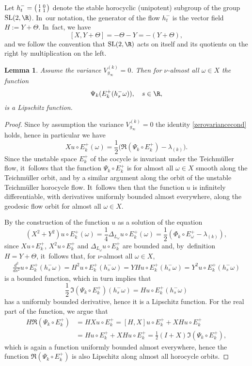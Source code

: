 \documentclass[JEP,XML,SOM,Unicode,published]{cedram}
\newenvironment{smallpmatrix}{\big(\begin{smallmatrix}}{\end{smallmatrix}\big)}
\theoremstyle{plain}
\newtheorem{lemma}[thm]{Lemma}
\theoremstyle{definition}
\numberwithin{equation}{subsection}
\newcommand{\SL}{\mathrm{SL}}
\let\laplacian\Delta
\begin{document}
Let $h^-_t =
\begin{smallpmatrix} 1 & 0 \\ t & 1 \end{smallpmatrix}$ denote the stable horocyclic (unipotent) subgroup of the group $\SL(2,\R)$. In~our notation, the generator of the flow $h^-_t$ is the vector field $H:=Y+ \Theta$. In~fact, we have
\[
[X, Y+\Theta] =- \Theta -Y = -(Y+\Theta),
\]
and we follow the convention that $\SL(2,\R)$ acts on itself and its quotients on the right by multiplication on the left.

\begin{lemma}
\label{lemma:Lipschitz} Assume the variance $V^{(k)}_{g_\infty} =0$. Then for $\nu$-almost all $\omega \in X$ the function
\[
\Psi_k (E^+_k(h^-_s \omega)), \quad s \in \R,
\]
is a Lipschitz function.
\end{lemma}
\begin{proof}
Since by assumption the variance $V^{(k)}_{g_\infty} =0$ the identity \eqref{zerovariancecond} holds, hence in particular we have
\[
X u \circ E^+_k(\omega) = \frac{1}{2} \bigl(\Re (\Psi_k \circ E^+_k) -\lambda_{(k)} \bigr).
\]
Since the unstable space $E^+_k$ of the cocycle is invariant under the Teichmüller flow, it~follows that the function $\Psi_k \circ E^+_k$ is
for almost all $\omega \in X$ smooth along the Teichmüller orbit, and
by a similar argument along the orbit of the unstable Teichmüller horocycle flow. It~follows then that the function $u$ is infinitely differentiable, with derivatives uniformly bounded almost everywhere, along
the geodesic flow orbit for almost all $\omega\in X$.

By the construction of the function $u$ as a solution of the equation
\[
\left(X^2 + Y^2 \right) u \circ E^+_k(\omega) = \frac{1}{4}\laplacian_{L_\omega} u \circ E^+_k(\omega) = \frac{1}{2} (\Phi_k\circ E^+_\omega -\lambda_{(k)}),
\]
since $Xu\circ E^+_k$, $X^2 u \circ E^+_k$ and $\laplacian_{L_\omega} u \circ E^+_k$ are bounded and, by~definition $H= Y+\Theta$, it~follows that, for $\nu$-almost all
$\omega \in X$,
\begin{align*}
\frac{d^2}{ds^2} u \circ E^+_k (h_s^{-} \omega)= H^2 u \circ E^+_k (h^-_s\omega) = YH u \circ E^+_k (h^-_s\omega) =Y^2 u \circ E^+_k (h^-_s\omega)
\end{align*}
is a bounded function, which in turn implies
that
\[
\frac{1}{2}\,\Im (\Psi_k \circ E^+_k) (h^-_s \omega) = Hu \circ E^+_k(h^-_s \omega)
\]
has a uniformly bounded derivative, hence it is a Lipschitz function. For the
real part of the function, we argue that
\[
\begin{aligned}
H \Re(\Psi_k \circ E^+_k) &= H X u \circ E^+_k = [H,X] u \circ E^+_k + XH u \circ E^+_k \\ & = H u\circ E^+_k + X Hu\circ E^+_k =
\frac{1}{2} (I+ X)\Im(\Psi_k \circ E^+_k),
\end{aligned}
\]
which is again a function uniformly bounded almost everywhere, hence the function
$\Re(\Psi_k \circ E^+_k)$ is also Lipschitz
along almost all horocycle orbits.
\end{proof}
\end{document}
